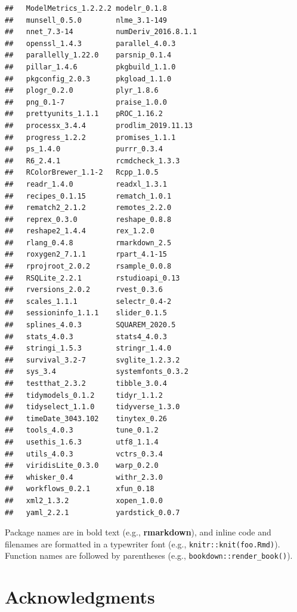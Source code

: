 \documentclass[
]{krantz}
\begin{document}
\begin{verbatim}
##   ModelMetrics_1.2.2.2 modelr_0.1.8        
##   munsell_0.5.0        nlme_3.1-149        
##   nnet_7.3-14          numDeriv_2016.8.1.1 
##   openssl_1.4.3        parallel_4.0.3      
##   parallelly_1.22.0    parsnip_0.1.4       
##   pillar_1.4.6         pkgbuild_1.1.0      
##   pkgconfig_2.0.3      pkgload_1.1.0       
##   plogr_0.2.0          plyr_1.8.6          
##   png_0.1-7            praise_1.0.0        
##   prettyunits_1.1.1    pROC_1.16.2         
##   processx_3.4.4       prodlim_2019.11.13  
##   progress_1.2.2       promises_1.1.1      
##   ps_1.4.0             purrr_0.3.4         
##   R6_2.4.1             rcmdcheck_1.3.3     
##   RColorBrewer_1.1-2   Rcpp_1.0.5          
##   readr_1.4.0          readxl_1.3.1        
##   recipes_0.1.15       rematch_1.0.1       
##   rematch2_2.1.2       remotes_2.2.0       
##   reprex_0.3.0         reshape_0.8.8       
##   reshape2_1.4.4       rex_1.2.0           
##   rlang_0.4.8          rmarkdown_2.5       
##   roxygen2_7.1.1       rpart_4.1-15        
##   rprojroot_2.0.2      rsample_0.0.8       
##   RSQLite_2.2.1        rstudioapi_0.13     
##   rversions_2.0.2      rvest_0.3.6         
##   scales_1.1.1         selectr_0.4-2       
##   sessioninfo_1.1.1    slider_0.1.5        
##   splines_4.0.3        SQUAREM_2020.5      
##   stats_4.0.3          stats4_4.0.3        
##   stringi_1.5.3        stringr_1.4.0       
##   survival_3.2-7       svglite_1.2.3.2     
##   sys_3.4              systemfonts_0.3.2   
##   testthat_2.3.2       tibble_3.0.4        
##   tidymodels_0.1.2     tidyr_1.1.2         
##   tidyselect_1.1.0     tidyverse_1.3.0     
##   timeDate_3043.102    tinytex_0.26        
##   tools_4.0.3          tune_0.1.2          
##   usethis_1.6.3        utf8_1.1.4          
##   utils_4.0.3          vctrs_0.3.4         
##   viridisLite_0.3.0    warp_0.2.0          
##   whisker_0.4          withr_2.3.0         
##   workflows_0.2.1      xfun_0.18           
##   xml2_1.3.2           xopen_1.0.0         
##   yaml_2.2.1           yardstick_0.0.7
\end{verbatim}

Package names are in bold text (e.g., \textbf{rmarkdown}), and inline code and filenames are formatted in a typewriter font (e.g., \texttt{knitr::knit(\textquotesingle{}foo.Rmd\textquotesingle{})}). Function names are followed by parentheses (e.g., \texttt{bookdown::render\_book()}).

\hypertarget{acknowledgments}{%
\section*{Acknowledgments}\label{acknowledgments}}
\end{document}
